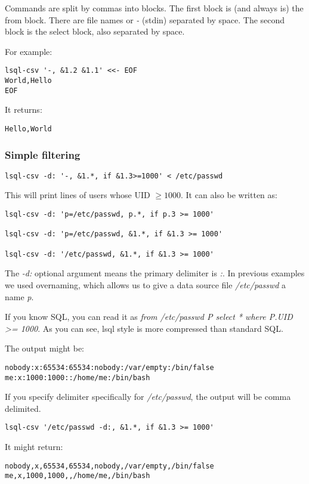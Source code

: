 Commands are split by commas into blocks. The first block is (and always is) the from block. There are file names or \textit{-} (stdin) separated by space. The second block is the select block, also separated by space.

For example:
\begin{verbatim}
lsql-csv '-, &1.2 &1.1' <<- EOF
World,Hello
EOF
\end{verbatim}
It returns:
\begin{verbatim}
Hello,World
\end{verbatim}


\subsubsection{Simple filtering}

\begin{verbatim}
lsql-csv -d: '-, &1.*, if &1.3>=1000' < /etc/passwd
\end{verbatim}
This will print lines of users whose UID $\geq 1000$. It can also be written as:
\begin{verbatim}
lsql-csv -d: 'p=/etc/passwd, p.*, if p.3 >= 1000'
    
lsql-csv -d: 'p=/etc/passwd, &1.*, if &1.3 >= 1000'

lsql-csv -d: '/etc/passwd, &1.*, if &1.3 >= 1000'
\end{verbatim}
The \textit{-d:} optional argument means the primary delimiter is \textit{:}. In previous examples we used overnaming, which allows us to give a data source file \textit{/etc/passwd} a name \textit{p}.

If you know SQL, you can read it as \textit{from /etc/passwd P select * where P.UID \textgreater= 1000}. As you can see, lsql style is more compressed than standard SQL.

The output might be:
\begin{verbatim}
nobody:x:65534:65534:nobody:/var/empty:/bin/false
me:x:1000:1000::/home/me:/bin/bash
\end{verbatim}

If you specify delimiter specifically for \textit{/etc/passwd}, the output will be comma delimited.
\begin{verbatim}
lsql-csv '/etc/passwd -d:, &1.*, if &1.3 >= 1000'
\end{verbatim}
It might return:
\begin{verbatim}
nobody,x,65534,65534,nobody,/var/empty,/bin/false
me,x,1000,1000,,/home/me,/bin/bash
\end{verbatim}


